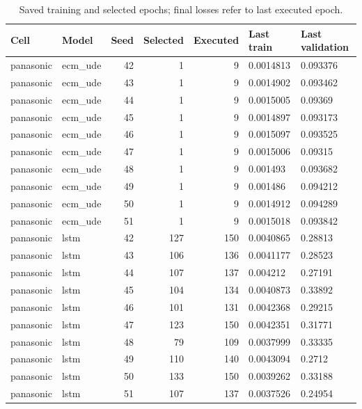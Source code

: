 \begin{table}[!t]
\centering
\footnotesize
\caption{Saved training and selected epochs; final losses refer to last executed epoch.}
\label{tab:reviewer-epochs-2}
\setlength{\tabcolsep}{3pt}
\begin{tabular}{llrrr p{} p{}}
\toprule
Cell & Model & Seed & Selected & Executed & Last train & Last validation \\
\midrule
panasonic & ecm\_ude & 42 & 1 & 9 & 0.0014813 & 0.093376 \\
panasonic & ecm\_ude & 43 & 1 & 9 & 0.0014902 & 0.093462 \\
panasonic & ecm\_ude & 44 & 1 & 9 & 0.0015005 & 0.09369 \\
panasonic & ecm\_ude & 45 & 1 & 9 & 0.0014897 & 0.093173 \\
panasonic & ecm\_ude & 46 & 1 & 9 & 0.0015097 & 0.093525 \\
panasonic & ecm\_ude & 47 & 1 & 9 & 0.0015006 & 0.09315 \\
panasonic & ecm\_ude & 48 & 1 & 9 & 0.001493 & 0.093682 \\
panasonic & ecm\_ude & 49 & 1 & 9 & 0.001486 & 0.094212 \\
panasonic & ecm\_ude & 50 & 1 & 9 & 0.0014912 & 0.094289 \\
panasonic & ecm\_ude & 51 & 1 & 9 & 0.0015018 & 0.093842 \\
panasonic & lstm & 42 & 127 & 150 & 0.0040865 & 0.28813 \\
panasonic & lstm & 43 & 106 & 136 & 0.0041177 & 0.28523 \\
panasonic & lstm & 44 & 107 & 137 & 0.004212 & 0.27191 \\
panasonic & lstm & 45 & 104 & 134 & 0.0040873 & 0.33892 \\
panasonic & lstm & 46 & 101 & 131 & 0.0042368 & 0.29215 \\
panasonic & lstm & 47 & 123 & 150 & 0.0042351 & 0.31771 \\
panasonic & lstm & 48 & 79 & 109 & 0.0037999 & 0.33335 \\
panasonic & lstm & 49 & 110 & 140 & 0.0043094 & 0.2712 \\
panasonic & lstm & 50 & 133 & 150 & 0.0039262 & 0.33188 \\
panasonic & lstm & 51 & 107 & 137 & 0.0037526 & 0.24954 \\
\bottomrule
\end{tabular}
\end{table}

